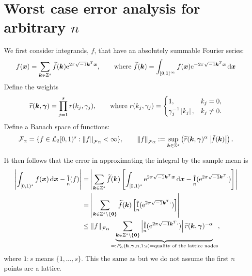 \documentclass[authoryear]{elsarticle}
\newcommand{\tr}{\widetilde{r}}
\newcommand{\appxintn}{\appxint_n}
\DeclareMathOperator{\appxint}{\hat{I}}
\newcommand{\onetos}{1\!:\!s}
\begin{document}
\section{Worst case error analysis for arbitrary $n$}
We first consider integrands, $f$, that have an absolutely summable Fourier series:
\begin{equation} \label{eq:fseries}
    f(\boldsymbol{x}) = \sum_{\boldsymbol{k} \in \mathbb{Z}^{s}} \widetilde{f}(\boldsymbol{k}) \mathrm{e}^{2 \pi \sqrt{-1} \boldsymbol{k}^T \boldsymbol{x}}, \qquad \text{where } \widetilde{f}(\boldsymbol{k}) = \int_{[0,1)^{\infty}} f(\boldsymbol{x}) \mathrm{e}^{-2 \pi \sqrt{-1} \boldsymbol{k}^T \boldsymbol{x}}\, {\rm d} \boldsymbol{x}
\end{equation}
Define the weights
\begin{equation}
\tr(\vk,\vgamma) = \prod_{j=1}^{s} r(k_{j},\gamma_{j}),
\qquad \text{where } r(k_{j},\gamma_{j})=\begin{cases} 1, &
k_{j}=0, \\ \gamma_{j}^{-1}\abs{k_{j}}, & k_{j} \ne 0.  \end{cases}
\end{equation}
Define a Banach
space of functions:
$$
\cf_{\alpha} = \{ f \in \cl_2[0,1)^{s} :
\norm[\cf{\alpha}]{f} < \infty \}, \qquad
\norm[\cf{\alpha}]{f} := \sup_{\vk \in \integers^{s}}
\left(\tr(\vk,\vgamma)^{\alpha} \abs{\tilde{f}(\vk)} \right).
$$



It then follows that the error in approximating the integral by the sample mean is
\begin{align} \label{eq:wcerrPalpha}
\nonumber
\abs{\int_{[0,1)^{s}} f(\vx) \, \dif \vx - \appxint_n(f)} &
= \abs{\sum_{\vk \in \integers^{s}} \tf(\vk) \left[\int_{[0,1)^{s}} \me^{2 \pi \sqrt{-1} \vk^T \vx} \, \dif \vx - \appxintn(\me^{2 \pi \sqrt{-1} \vk^T \cdot})\right]} \\
\nonumber
& = \abs{\sum_{\vk \in \integers^s \setminus\{\vzero\}} \tf(\vk) \left[ \appxintn(\me^{2 \pi \sqrt{-1} \vk^T \cdot})\right]} \\
& \le \norm[\cf{\alpha}]{f} \underbrace{\sum_{\vk \in \integers^s \setminus\{\vzero\}} \abs{\appxint_n(\me^{2 \pi \sqrt{-1} \vk^T \cdot})}\tr(\vk,\vgamma)^{-\alpha}}_{=: P_\alpha(\vh,\vgamma,n,1:s) = \text{quality of the lattice nodes}},  %
\end{align}
where $\onetos$ means $\{1, \ldots, s\}$.
This the same as \cite[(4)]{HicNie03a} but we do not assume the first $n$ points are a lattice. 
\end{document}
